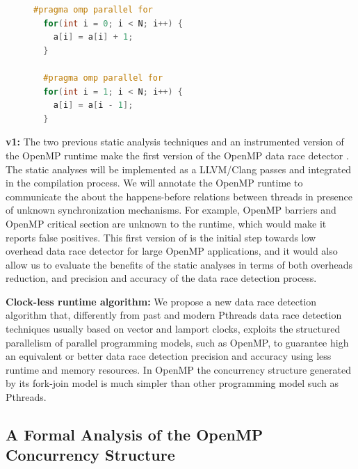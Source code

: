\begin{figure}
  \vspace{-2ex}
  \begin{lstlisting}[language=C++, caption=OpenMP loops with and without loop-carried data dependency., label=code:example01]
  #pragma omp parallel for
  for(int i = 0; i < N; i++) {
    a[i] = a[i] + 1;
  }

  #pragma omp parallel for
  for(int i = 1; i < N; i++) {
    a[i] = a[i - 1];
  }
  \end{lstlisting}
\end{figure}

\textbf{\archer v1:} The two previous static analysis techniques and an
instrumented version of the OpenMP runtime make the first version of the
OpenMP data race detector \archer.
%
The static analyses will be implemented as a LLVM/Clang passes and integrated
in the compilation process.
%
We will annotate the OpenMP runtime to communicate the \tsan about the
happens-before relations between threads in presence of unknown
synchronization mechanisms.
%
For example, OpenMP barriers and OpenMP critical section are unknown to the
\tsan runtime, which would make it reports false positives.
%
This first version of \archer is the initial step towards low overhead data
race detector for large OpenMP applications, and it would also allow us to
evaluate the benefits of the static analyses in terms of both overheads
reduction, and precision and accuracy of the data race detection process.

\textbf{Clock-less runtime algorithm:} We propose a new data race detection
algorithm that, differently from past and modern Pthreads data race detection
techniques usually based on vector and lamport clocks, exploits the structured
parallelism of parallel programming models, such as OpenMP, to guarantee high
an equivalent or better data race detection precision and accuracy using less
runtime and memory resources.
%
In OpenMP the concurrency structure generated by its fork-join model is much
simpler than other programming model such as Pthreads.

\subsection{A Formal Analysis of the OpenMP Concurrency Structure}
\label{subsec:opsem}

